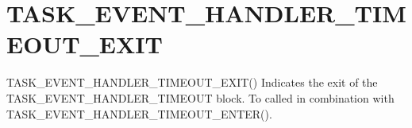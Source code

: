\section{TASK\_EVENT\_HANDLER\_TIMEOUT\_EXIT}
\label{func:TASK\_EVENT\_HANDLER\_TIMEOUT\_EXIT}
\begin{pdfunction}
{TASK\_EVENT\_HANDLER\_TIMEOUT\_EXIT()}
{ 
Indicates the exit of the TASK\_EVENT\_HANDLER\_TIMEOUT block. To 
called in combination with TASK\_EVENT\_HANDLER\_TIMEOUT\_ENTER(). }
\end{pdfunction}
